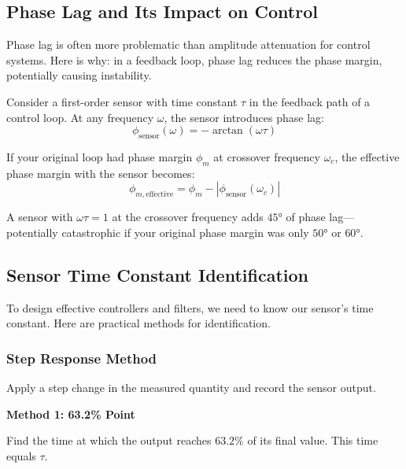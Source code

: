 \subsection{Phase Lag and Its Impact on Control}

Phase lag is often more problematic than amplitude attenuation for control systems. Here is why: in a feedback loop, phase lag reduces the phase margin, potentially causing instability.

Consider a first-order sensor with time constant $\tau$ in the feedback path of a control loop. At any frequency $\omega$, the sensor introduces phase lag:
\begin{equation}
\phi_{\text{sensor}}(\omega) = -\arctan(\omega\tau)
\label{eq:sensor_phase_lag}
\end{equation}

If your original loop had phase margin $\phi_m$ at crossover frequency $\omega_c$, the effective phase margin with the sensor becomes:
\begin{equation}
\phi_{m,\text{effective}} = \phi_m - |\phi_{\text{sensor}}(\omega_c)|
\label{eq:effective_phase_margin}
\end{equation}

A sensor with $\omega\tau = 1$ at the crossover frequency adds $45°$ of phase lag---potentially catastrophic if your original phase margin was only $50°$ or $60°$.


\subsection{Sensor Time Constant Identification}

To design effective controllers and filters, we need to know our sensor's time constant. Here are practical methods for identification.

\subsubsection{Step Response Method}

Apply a step change in the measured quantity and record the sensor output.

\textbf{Method 1: 63.2\% Point}

Find the time at which the output reaches $63.2\%$ of its final value. This time equals $\tau$.

